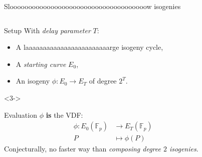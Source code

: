 \documentclass[aspectratio=169]{beamer}
\newcommand{\F}{\mathbb{F}}
\begin{document}

\begin{frame}{Slooooooooooooooooooooooooooooooooooooow isogenies}
  \begin{columns}
    \begin{column}{0.6\textwidth}
      \begin{block}{Setup}
        With \emph{delay parameter} $T$:
        \begin{itemize}
        \item A laaaaaaaaaaaaaaaaaaaaaaaarge isogeny cycle,
        \item<2-> A \emph{starting curve} $E_0$,
        \item<2-> An isogeny \emph{$\phi:E_0\to E_T$} of degree \emph{$2^T$}.
        \end{itemize}
      \end{block}

      \begin{uncoverenv}<3->
        \begin{block}{Evaluation}
          $\phi$ \textbf{is} the VDF:
          \begin{align*}
            \phi:E_0(\F_p) &\longrightarrow E_T(\F_p)\\
            P &\longmapsto \phi(P)
          \end{align*}
          Conjecturally, no faster way than \emph{composing degree $2$
            isogenies}.
        \end{block}
      \end{uncoverenv}
    \end{column}
    \begin{column}{0.37\textwidth}
      \centering
    \end{column}
  \end{columns}  
\end{frame}
\end{document}
